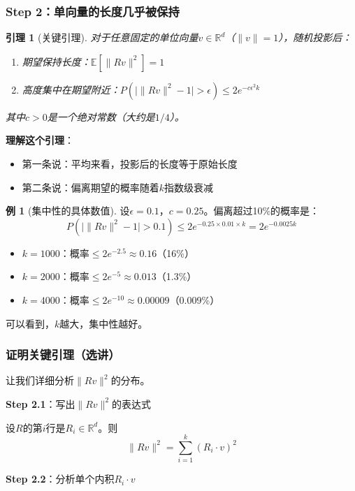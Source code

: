 \documentclass[11pt,a4paper]{ctexart}
\newtheorem{lemma}[theorem]{引理}
\theoremstyle{definition}
\newtheorem{example}[theorem]{例}
\theoremstyle{remark}
\begin{document}
\subsubsection{Step 2：单向量的长度几乎被保持}

\begin{lemma}[关键引理]
对于任意固定的单位向量$v \in \mathbb{R}^d$（$\|v\| = 1$），随机投影后：
\begin{enumerate}
    \item 期望保持长度：$\mathbb{E}[\|Rv\|^2] = 1$
    \item 高度集中在期望附近：$P\left(\big|\|Rv\|^2 - 1\big| > \epsilon\right) \leq 2e^{-c\epsilon^2 k}$
\end{enumerate}
其中$c > 0$是一个绝对常数（大约是$1/4$）。
\end{lemma}

\textbf{理解这个引理}：
\begin{itemize}
    \item 第一条说：平均来看，投影后的长度等于原始长度
    \item 第二条说：偏离期望的概率随着$k$指数级衰减
\end{itemize}

\begin{example}[集中性的具体数值]
设$\epsilon = 0.1$，$c = 0.25$。偏离超过10\%的概率是：
\[
P\left(\big|\|Rv\|^2 - 1\big| > 0.1\right) \leq 2e^{-0.25 \times 0.01 \times k} = 2e^{-0.0025k}
\]
\begin{itemize}
    \item $k = 1000$：概率$\leq 2e^{-2.5} \approx 0.16$（16\%）
    \item $k = 2000$：概率$\leq 2e^{-5} \approx 0.013$（1.3\%）
    \item $k = 4000$：概率$\leq 2e^{-10} \approx 0.00009$（0.009\%）
\end{itemize}
可以看到，$k$越大，集中性越好。
\end{example}

\subsubsection{证明关键引理（选讲）}

让我们详细分析$\|Rv\|^2$的分布。

\textbf{Step 2.1}：写出$\|Rv\|^2$的表达式

设$R$的第$i$行是$R_i \in \mathbb{R}^d$。则
\[
\|Rv\|^2 = \sum_{i=1}^k (R_i \cdot v)^2
\]

\textbf{Step 2.2}：分析单个内积$R_i \cdot v$
\end{document}

